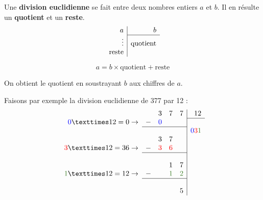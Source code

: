 \documentclass[../€Cours-complet/Cours-complet]{subfiles}
\begin{document}
\begin{cours}
	Une \textbf{division euclidienne} se fait entre deux nombres entiers $a$ et $b$. Il en résulte un \textbf{quotient} et un \textbf{reste}.
	$$
		\begin{array}{r|r}
			a            & b               \\
			\cline{2-2}
			\vdots       & \text{quotient} \\
			\text{reste} &
		\end{array}
	$$

	$$ a = b × \text{quotient} + \text{reste} $$

	On obtient le quotient en soustrayant $b$ aux chiffres de $a$.
\end{cours}

\begin{exemple}
	Faisons par exemple la division euclidienne de 377 par 12 :
	$$
		\begin{array}{rrrrr|r}
			                                        &   & 3                   & 7                         & 7                         & 12                                                             \\
			\cline{6-6}
			\textcolor{blue}{0} × 12 = 0 \to        & - & \textcolor{blue}{0} &                           &                           &                                                                \\
			\cline{2-5}
			                                        &   &                     &                           &                           & \textcolor{blue}{0}\textcolor{red}{3}\textcolor{OliveGreen}{1} \\
			                                        &   & 3                   & 7                         &                           &                                                                \\
			\textcolor{red}{3} × 12 = 36 \to        & - & \textcolor{red}{3}  & \textcolor{red}{6}        &                           &                                                                \\
			\cline{2-5}
			                                        &   &                     &                           &                           &                                                                \\
			                                        &   &                     & 1                         & 7                         &                                                                \\
			\textcolor{OliveGreen}{1} × 12 = 12 \to & - &                     & \textcolor{OliveGreen}{1} & \textcolor{OliveGreen}{2} &                                                                \\
			\cline{2-5}
			                                        &   &                     &                           &                           &                                                                \\
			                                        &   &                     &                           & 5                         &
		\end{array}
	$$


\end{exemple}
\end{document}

